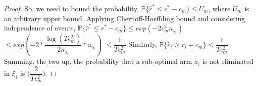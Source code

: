 \begin{proof}
	So, we need to bound the probability,
\newline\hspace*{4em} $\mathbb{P}\lbrace\hat{r}^{*}\leq r^{*} - c_{m}\rbrace\leq U_{m}$, where $U_{m}$ is an  arbitrary upper bound.
\newline
Applying Chernoff-Hoeffding bound and considering independence of events,
\newline
\newline\hspace*{0em} $\mathbb{P}\lbrace\hat{r}^{*}\leq r^{*} - c_{m}\rbrace\leq exp(-2c_{m}^{2}n_{s_{i}})$
\newline\hspace*{2em} $\leq exp(-2 * \dfrac{\log (T\epsilon_{m}^{2})}{2 n_{s_{i}}} *n_{s_{i}})$
\newline\hspace*{2em} $\leq \dfrac{1}{T\epsilon_{m}^{2}}$
\newline
Similarly, $\mathbb{P}\lbrace\hat{r}_{i}\geq r_{i} + c_{m}\rbrace\leq \dfrac{1}{T\epsilon_{m}^{2}}$
\newline
Summing, the two up, the probability that a sub-optimal arm $a_{i}$ is not eliminated in $\xi_{1}$ is  $\bigg(\dfrac{2}{T\epsilon_{m}^{2}}\bigg)$. 
\end{proof}



